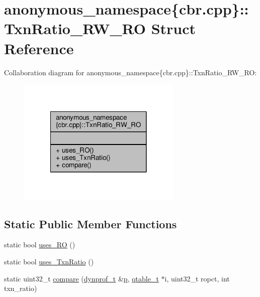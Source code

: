 \hypertarget{structanonymous__namespace_02cbr_8cpp_03_1_1TxnRatio__RW__RO}{\section{anonymous\-\_\-namespace\{cbr.\-cpp\}\-:\-:Txn\-Ratio\-\_\-\-R\-W\-\_\-\-R\-O Struct Reference}
\label{structanonymous__namespace_02cbr_8cpp_03_1_1TxnRatio__RW__RO}
}


Collaboration diagram for anonymous\-\_\-namespace\{cbr.\-cpp\}\-:\-:Txn\-Ratio\-\_\-\-R\-W\-\_\-\-R\-O\-:
\nopagebreak
\begin{figure}[H]
\begin{center}
\leavevmode
\includegraphics[width=222pt]{structanonymous__namespace_02cbr_8cpp_03_1_1TxnRatio__RW__RO__coll__graph}
\end{center}
\end{figure}
\subsection*{Static Public Member Functions}
\begin{DoxyCompactItemize}
\item 
static bool \hyperlink{structanonymous__namespace_02cbr_8cpp_03_1_1TxnRatio__RW__RO_a9b1d691752b0af77cc4a3fdd852ea61a}{uses\-\_\-\-R\-O} ()
\item 
static bool \hyperlink{structanonymous__namespace_02cbr_8cpp_03_1_1TxnRatio__RW__RO_ac29a2e000c604c80dc4013f6cc8eb7a2}{uses\-\_\-\-Txn\-Ratio} ()
\item 
static uint32\-\_\-t \hyperlink{structanonymous__namespace_02cbr_8cpp_03_1_1TxnRatio__RW__RO_a2e54cc86daacddd3152d30c67f8f8e1f}{compare} (\hyperlink{structstm_1_1dynprof__t}{dynprof\-\_\-t} \&\hyperlink{counted__ptr_8hpp_a5c9f59d7c24e3fd6ceae319a968fc3e0}{p}, \hyperlink{structstm_1_1qtable__t}{qtable\-\_\-t} $\ast$i, uint32\-\_\-t ropct, int txn\-\_\-ratio)
\end{DoxyCompactItemize}


